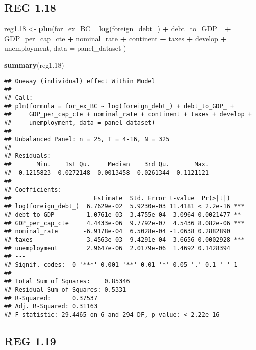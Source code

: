 \documentclass[]{article}
\newenvironment{Shaded}{\begin{snugshade}}{\end{snugshade}}
\newcommand{\KeywordTok}[1]{\textcolor[rgb]{0.13,0.29,0.53}{\textbf{#1}}}
\newcommand{\DataTypeTok}[1]{\textcolor[rgb]{0.13,0.29,0.53}{#1}}
\newcommand{\DecValTok}[1]{\textcolor[rgb]{0.00,0.00,0.81}{#1}}
\newcommand{\StringTok}[1]{\textcolor[rgb]{0.31,0.60,0.02}{#1}}
\newcommand{\OperatorTok}[1]{\textcolor[rgb]{0.81,0.36,0.00}{\textbf{#1}}}
\newcommand{\NormalTok}[1]{#1}
\begin{document}
\subsection{REG 1.18}\label{reg-1.18}

\begin{Shaded}
\begin{Highlighting}[]
\NormalTok{reg1.}\DecValTok{18}\NormalTok{ <-}\StringTok{ }\KeywordTok{plm}\NormalTok{(for_ex_BC }\OperatorTok{~}\StringTok{ }\KeywordTok{log}\NormalTok{(foreign_debt_) }\OperatorTok{+}\StringTok{ }\NormalTok{debt_to_GDP_ }\OperatorTok{+}\StringTok{ }\NormalTok{GDP_per_cap_cte }\OperatorTok{+}\StringTok{ }\NormalTok{nominal_rate }\OperatorTok{+}\StringTok{ }\NormalTok{continent }\OperatorTok{+}\StringTok{ }\NormalTok{taxes }\OperatorTok{+}\StringTok{ }\NormalTok{develop }\OperatorTok{+}\StringTok{ }\NormalTok{unemployment, }\DataTypeTok{data =}\NormalTok{ panel_dataset )}

\KeywordTok{summary}\NormalTok{(reg1.}\DecValTok{18}\NormalTok{)}
\end{Highlighting}
\end{Shaded}

\begin{verbatim}
## Oneway (individual) effect Within Model
## 
## Call:
## plm(formula = for_ex_BC ~ log(foreign_debt_) + debt_to_GDP_ + 
##     GDP_per_cap_cte + nominal_rate + continent + taxes + develop + 
##     unemployment, data = panel_dataset)
## 
## Unbalanced Panel: n = 25, T = 4-16, N = 325
## 
## Residuals:
##       Min.    1st Qu.     Median    3rd Qu.       Max. 
## -0.1215823 -0.0272148  0.0013458  0.0261344  0.1121121 
## 
## Coefficients:
##                       Estimate  Std. Error t-value  Pr(>|t|)    
## log(foreign_debt_)  6.7629e-02  5.9230e-03 11.4181 < 2.2e-16 ***
## debt_to_GDP_       -1.0761e-03  3.4755e-04 -3.0964 0.0021477 ** 
## GDP_per_cap_cte     4.4433e-06  9.7792e-07  4.5436 8.082e-06 ***
## nominal_rate       -6.9178e-04  6.5028e-04 -1.0638 0.2882890    
## taxes               3.4563e-03  9.4291e-04  3.6656 0.0002928 ***
## unemployment        2.9647e-06  2.0179e-06  1.4692 0.1428394    
## ---
## Signif. codes:  0 '***' 0.001 '**' 0.01 '*' 0.05 '.' 0.1 ' ' 1
## 
## Total Sum of Squares:    0.85346
## Residual Sum of Squares: 0.5331
## R-Squared:      0.37537
## Adj. R-Squared: 0.31163
## F-statistic: 29.4465 on 6 and 294 DF, p-value: < 2.22e-16
\end{verbatim}

\subsection{REG 1.19}\label{reg-1.19}
\end{document}
